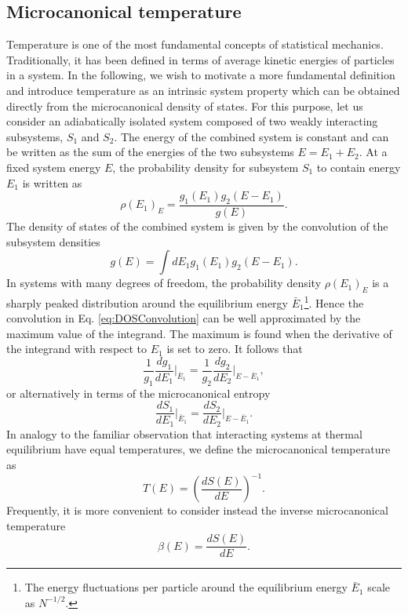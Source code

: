 \documentclass[12pt]{report}
\begin{document}
\subsection{Microcanonical temperature}
Temperature is one of the most fundamental concepts of statistical mechanics. Traditionally, it has been defined in terms of average kinetic energies of particles in a system\cite{Pathria}. In the following, we wish to motivate a more fundamental definition and introduce temperature as an intrinsic system property which can be obtained directly from the microcanonical density of states. For this purpose, let us consider an adiabatically isolated system composed of two weakly interacting subsystems, $S_{1}$ and $S_{2}$. The energy of the combined system is constant and can be written as the sum of the energies of the two subsystems $E = E_{1} + E_{2}$. At a fixed system energy $E$, the probability density for subsystem $S_{1}$ to contain energy $E_{1}$ is written as 
\begin{equation}
\rho(E_{1})_{E} = \frac{g_{1}(E_{1})g_{2}(E-E_{1})}{g(E)}.
\end{equation}
The density of states of the combined system is given by the convolution of the subsystem densities
\begin{equation}
\label{eq:DOSConvolution}
g(E) = \int dE_{1}g_{1}(E_{1})g_{2}(E-E_{1}).
\end{equation}
In systems with many degrees of freedom, the probability density $\rho(E_{1})_{E}$ is a sharply peaked distribution around the equilibrium energy $\bar{E}_{1}$\footnote{The energy fluctuations per particle around the equilibrium energy $\bar{E}_{1}$ scale as $N^{-1/2}$\cite{Sethna2006}.}. Hence the convolution in Eq. \ref{eq:DOSConvolution} can be well approximated by the maximum value of the integrand\cite{Sethna2006}. The maximum is found when the derivative of the integrand with respect to $E_{1}$ is set to zero. It follows that
\begin{equation}
\frac{1}{g_{1}}\frac{dg_{1}}{dE_{1}}\bigg|_{\bar{E}_{1}} = \frac{1}{g_{2}}\frac{dg_{2}}{dE_{2}}\bigg|_{E - \bar{E}_{1}},
\end{equation}
or alternatively in terms of the microcanonical entropy
\begin{equation}
\frac{dS_{1}}{dE_1}\bigg|_{\bar{E}_{1}} = \frac{dS_{2}}{dE_{2}}\bigg|_{E - \bar{E}_{1}}.
\end{equation}
In analogy to the familiar observation that interacting systems at thermal equilibrium have equal temperatures, we define the microcanonical temperature as 
\begin{equation}
T(E) = \left(\frac{dS(E)}{dE}\right)^{-1}.
\end{equation}
Frequently, it is more convenient to consider instead the inverse microcanonical temperature 
\begin{equation}
\beta(E) = \frac{dS(E)}{dE}.
\end{equation}
\end{document}
